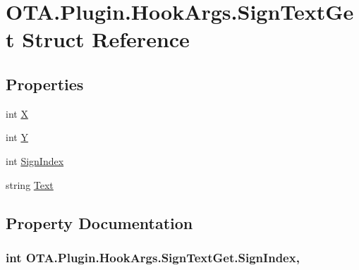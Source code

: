 \hypertarget{struct_o_t_a_1_1_plugin_1_1_hook_args_1_1_sign_text_get}{}\section{O\+T\+A.\+Plugin.\+Hook\+Args.\+Sign\+Text\+Get Struct Reference}
\label{struct_o_t_a_1_1_plugin_1_1_hook_args_1_1_sign_text_get}
\subsection*{Properties}
\begin{DoxyCompactItemize}
\item 
int \hyperlink{struct_o_t_a_1_1_plugin_1_1_hook_args_1_1_sign_text_get_a729fa7d71a41ccfc04b55a47fe8c58b8}{X}
\item 
int \hyperlink{struct_o_t_a_1_1_plugin_1_1_hook_args_1_1_sign_text_get_addf1eff9571d76f3b4581c035ff37994}{Y}
\item 
int \hyperlink{struct_o_t_a_1_1_plugin_1_1_hook_args_1_1_sign_text_get_ae8fb846ded177c041cd51fba79f8d4cc}{Sign\+Index}
\item 
string \hyperlink{struct_o_t_a_1_1_plugin_1_1_hook_args_1_1_sign_text_get_a85ac6ed7cb76de53440f96634a8873f1}{Text}
\end{DoxyCompactItemize}


\subsection{Property Documentation}
\hypertarget{struct_o_t_a_1_1_plugin_1_1_hook_args_1_1_sign_text_get_ae8fb846ded177c041cd51fba79f8d4cc}{}
\subsubsection[{Sign\+Index}]{\setlength{\rightskip}{0pt plus 5cm}int O\+T\+A.\+Plugin.\+Hook\+Args.\+Sign\+Text\+Get.\+Sign\+Index\hspace{0.3cm}{\ttfamily [get]}, {\ttfamily [set]}}\label{struct_o_t_a_1_1_plugin_1_1_hook_args_1_1_sign_text_get_ae8fb846ded177c041cd51fba79f8d4cc}
\hypertarget{struct_o_t_a_1_1_plugin_1_1_hook_args_1_1_sign_text_get_a85ac6ed7cb76de53440f96634a8873f1}{}
